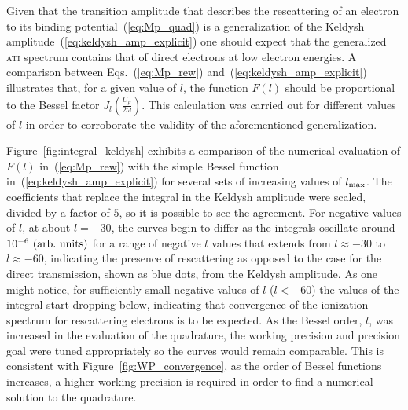 

Given that the transition amplitude that describes the rescattering of
an electron to its binding potential~(\ref{eq:Mp_quad}) is a
generalization of the Keldysh
amplitude~(\ref{eq:keldysh_amp_explicit}) one should expect that the
generalized \textsc{ati} spectrum contains that of direct electrons at
low electron energies. A comparison between Eqs.~(\ref{eq:Mp_rew})
and~(\ref{eq:keldysh_amp_explicit}) illustrates that, for a given
value of $l$, the function $F(l)$ should be proportional to the Bessel
factor $J_{l}\left( \frac{U_{p}}{2\omega} \right)$. This calculation
was carried out for different values of $l$ in order to corroborate
the validity of the aforementioned generalization.

Figure~\ref{fig:integral_keldysh} exhibits a comparison of the
numerical evaluation of $F(l)$ in~(\ref{eq:Mp_rew}) with the simple
Bessel function in~(\ref{eq:keldysh_amp_explicit}) for several sets of
increasing values of $l_{\rm{max}}$. The coefficients that replace the
integral in the Keldysh amplitude were scaled, divided by a factor of
$5$, so it is possible to see the agreement. For negative values of
$l$, at about $l=-30$, the curves begin to differ as the integrals
oscillate around $10^{-6}\ \rm{(arb.\ units)}$ for a range of negative
$l$ values that extends from $l\approx -30$ to $l\approx -60$,
indicating the presence of rescattering as opposed to the case for the
direct transmission, shown as blue dots, from the Keldysh
amplitude. As one might notice, for sufficiently small negative values
of $l$ ($l < -60$) the values of the integral start dropping below,
indicating that convergence of the ionization spectrum for
rescattering electrons is to be expected. As the Bessel order, $l$,
was increased in the evaluation of the quadrature, the working
precision and precision goal were tuned appropriately so the curves
would remain comparable. This is consistent with
Figure~\ref{fig:WP_convergence}, as the order of Bessel functions
increases, a higher working precision is required in order to find a
numerical solution to the quadrature.


